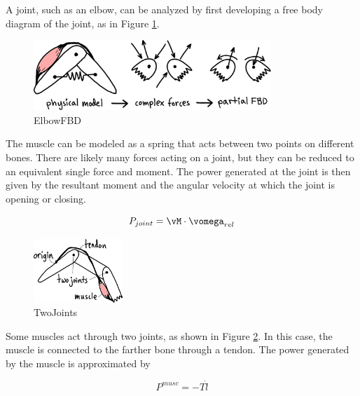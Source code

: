 A joint, such as an elbow, can be analyzed by first developing a free body diagram of the joint, as in Figure \ref{fig:ElbowFBD}.

%
\begin{figure}[h]		%
\begin{centering}
\includegraphics[width=0.8\textwidth]{Figures/ElbowFBD}\par
\end{centering}
\caption{ElbowFBD}
\label{fig:ElbowFBD}
\end{figure}
%

The muscle can be modeled as a spring that acts between two points on different bones. There are likely many forces acting on a joint, but they can be reduced to an equivalent single force and moment. The power generated at the joint is then given by the resultant moment and the angular velocity at which the joint is opening or closing.

\begin{equation}
P_{joint} = \vM \cdot \vomega_{rel}
\end{equation}

\begin{figure}[h]		%
\begin{centering}
\includegraphics[width=0.3\textwidth]{Figures/TwoJoints}\par
\end{centering}
\caption{TwoJoints}
\label{fig:TwoJoints}
\end{figure}
%

Some muscles act through two joints, as shown in Figure \ref{fig:TwoJoints}. In this case, the muscle is connected to the farther bone through a tendon. The power generated by the muscle is approximated by

\begin{equation}
P^{musc} = -T \dot{l}
\end{equation}

